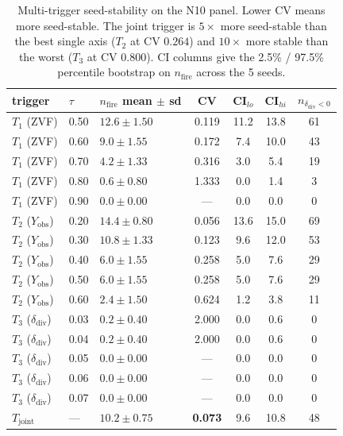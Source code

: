 \begin{table}[t]
\centering\small
\caption{Multi-trigger seed-stability on the N10 panel.  Lower CV
means more seed-stable.  The joint trigger is $5\times$ more
seed-stable than the best single axis ($T_2$ at CV $0.264$) and
$10\times$ more stable than the worst ($T_3$ at CV $0.800$).  CI
columns give the 2.5\% / 97.5\% percentile bootstrap on
$n_{\mathrm{fire}}$ across the 5 seeds.}
\label{tab:p7-multitrigger-seed}
\begin{tabular}{lllcccc}
\toprule
trigger & $\tau$ & $n_{\mathrm{fire}}$ mean $\pm$ sd & CV &
CI$_{lo}$ & CI$_{hi}$ & $n_{\delta_{\mathrm{div}}{<}0}$ \\
\midrule
$T_1$ (ZVF)      & 0.50 & $12.6 \pm 1.50$ & 0.119 & 11.2 & 13.8 & 61 \\
$T_1$ (ZVF)      & 0.60 & $ 9.0 \pm 1.55$ & 0.172 &  7.4 & 10.0 & 43 \\
$T_1$ (ZVF)      & 0.70 & $ 4.2 \pm 1.33$ & 0.316 &  3.0 &  5.4 & 19 \\
$T_1$ (ZVF)      & 0.80 & $ 0.6 \pm 0.80$ & 1.333 &  0.0 &  1.4 &  3 \\
$T_1$ (ZVF)      & 0.90 & $ 0.0 \pm 0.00$ &  ---  &  0.0 &  0.0 &  0 \\
\midrule
$T_2$ ($Y_{\mathrm{obs}}$) & 0.20 & $14.4 \pm 0.80$ & 0.056 & 13.6 & 15.0 & 69 \\
$T_2$ ($Y_{\mathrm{obs}}$) & 0.30 & $10.8 \pm 1.33$ & 0.123 &  9.6 & 12.0 & 53 \\
$T_2$ ($Y_{\mathrm{obs}}$) & 0.40 & $ 6.0 \pm 1.55$ & 0.258 &  5.0 &  7.6 & 29 \\
$T_2$ ($Y_{\mathrm{obs}}$) & 0.50 & $ 6.0 \pm 1.55$ & 0.258 &  5.0 &  7.6 & 29 \\
$T_2$ ($Y_{\mathrm{obs}}$) & 0.60 & $ 2.4 \pm 1.50$ & 0.624 &  1.2 &  3.8 & 11 \\
\midrule
$T_3$ ($\delta_{\mathrm{div}}$) & 0.03 & $0.2 \pm 0.40$ & 2.000 & 0.0 & 0.6 &  0 \\
$T_3$ ($\delta_{\mathrm{div}}$) & 0.04 & $0.2 \pm 0.40$ & 2.000 & 0.0 & 0.6 &  0 \\
$T_3$ ($\delta_{\mathrm{div}}$) & 0.05 & $0.0 \pm 0.00$ &  ---  & 0.0 & 0.0 &  0 \\
$T_3$ ($\delta_{\mathrm{div}}$) & 0.06 & $0.0 \pm 0.00$ &  ---  & 0.0 & 0.0 &  0 \\
$T_3$ ($\delta_{\mathrm{div}}$) & 0.07 & $0.0 \pm 0.00$ &  ---  & 0.0 & 0.0 &  0 \\
\midrule
$T_{\mathrm{joint}}$ & --- & $10.2 \pm 0.75$ & \textbf{0.073} & 9.6 & 10.8 & 48 \\
\bottomrule
\end{tabular}
\end{table}

